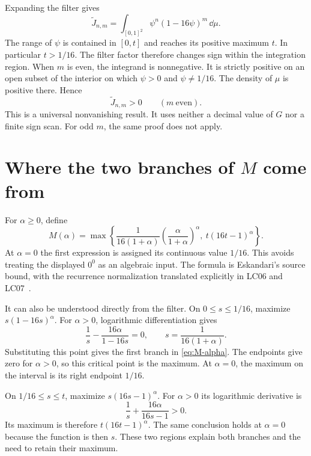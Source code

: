 Expanding the filter gives
\begin{equation}
 \widetilde J_{n,m}
 =\int_{[0,1]^2}\psi^n(1-16\psi)^m\,\dd\mu.
 \label{eq:bottleneck-filter}
\end{equation}
The range of $\psi$ is contained in $[0,t]$ and reaches its positive maximum $t$. In particular $t>1/16$. The filter factor therefore changes sign within the integration region. When $m$ is even, the integrand is nonnegative. It is strictly positive on an open subset of the interior on which $\psi>0$ and $\psi\ne1/16$. The density of $\mu$ is positive there. Hence
\begin{equation}
 \widetilde J_{n,m}>0\qquad(m\ \text{even}).
 \label{eq:even-filter-positive}
\end{equation}
This is a universal nonvanishing result. It uses neither a decimal value of $G$ nor a finite sign scan. For odd $m$, the same proof does not apply.

\section{Where the two branches of $M$ come from}

For $\alpha\geq0$, define
\begin{equation}
 M(\alpha)=\max\left\{
 \frac{1}{16(1+\alpha)}
 \left(\frac\alpha{1+\alpha}\right)^\alpha,
 \ t(16t-1)^\alpha
 \right\}.
 \label{eq:M-alpha}
\end{equation}
At $\alpha=0$ the first expression is assigned its continuous value $1/16$. This avoids treating the displayed $0^0$ as an algebraic input. The formula is Eskandari's source bound, with the recurrence normalization translated explicitly in LC06 and LC07~\cite{Eskandari2026}.

It can also be understood directly from the filter. On $0\leq s\leq1/16$, maximize $s(1-16s)^\alpha$. For $\alpha>0$, logarithmic differentiation gives
\begin{equation*}
 \frac1s-\frac{16\alpha}{1-16s}=0,
 \qquad s=\frac{1}{16(1+\alpha)}.
\end{equation*}
Substituting this point gives the first branch in \eqref{eq:M-alpha}. The endpoints give zero for $\alpha>0$, so this critical point is the maximum. At $\alpha=0$, the maximum on the interval is its right endpoint $1/16$.

On $1/16\leq s\leq t$, maximize $s(16s-1)^\alpha$. For $\alpha>0$ its logarithmic derivative is
\begin{equation*}
 \frac1s+\frac{16\alpha}{16s-1}>0.
\end{equation*}
Its maximum is therefore $t(16t-1)^\alpha$. The same conclusion holds at $\alpha=0$ because the function is then $s$. These two regions explain both branches and the need to retain their maximum.

